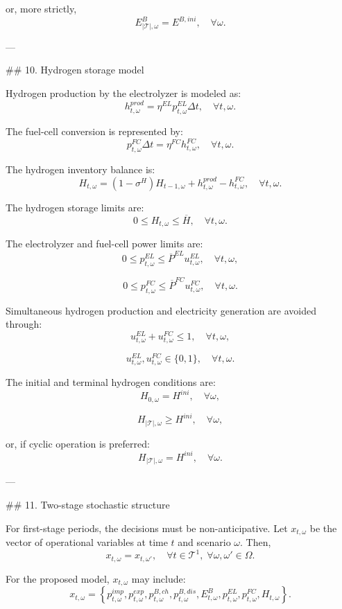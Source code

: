 or, more strictly,
$$ E^{B}_{|\mathcal{T}|,\omega}=E^{B,ini},
\quad \forall \omega. $$

---

## 10. Hydrogen storage model

Hydrogen production by the electrolyzer is modeled as:
$$ h^{prod}_{t,\omega}=\eta^{EL}p^{EL}_{t,\omega}\Delta t,
\quad \forall t,\omega. $$

The fuel-cell conversion is represented by:
$$ p^{FC}_{t,\omega}\Delta t=\eta^{FC}h^{FC}_{t,\omega},
\quad \forall t,\omega. $$

The hydrogen inventory balance is:
$$ H_{t,\omega}=(1-\sigma^{H})H_{t-1,\omega}
+h^{prod}_{t,\omega}-h^{FC}_{t,\omega},
\quad \forall t,\omega. $$

The hydrogen storage limits are:
$$ 0\le H_{t,\omega}\le \overline{H},
\quad \forall t,\omega. $$

The electrolyzer and fuel-cell power limits are:
$$ 0\le p^{EL}_{t,\omega}\le \overline{P}^{EL}u^{EL}_{t,\omega},
\quad \forall t,\omega, $$

$$ 0\le p^{FC}_{t,\omega}\le \overline{P}^{FC}u^{FC}_{t,\omega},
\quad \forall t,\omega. $$

Simultaneous hydrogen production and electricity generation are avoided through:
$$ u^{EL}_{t,\omega}+u^{FC}_{t,\omega}\le 1,
\quad \forall t,\omega, $$

$$ u^{EL}_{t,\omega},u^{FC}_{t,\omega}\in\{0,1\},
\quad \forall t,\omega. $$

The initial and terminal hydrogen conditions are:
$$ H_{0,\omega}=H^{ini},
\quad \forall \omega, $$

$$ H_{|\mathcal{T}|,\omega}\ge H^{ini},
\quad \forall \omega, $$

or, if cyclic operation is preferred:
$$ H_{|\mathcal{T}|,\omega}=H^{ini},
\quad \forall \omega. $$

---

## 11. Two-stage stochastic structure

For first-stage periods, the decisions must be non-anticipative. Let $x_{t,\omega}$ be the vector of operational variables at time $t$ and scenario $\omega$. Then,
$$ x_{t,\omega}=x_{t,\omega'},
\quad \forall t\in\mathcal{T}^{1},\; \forall \omega,\omega'\in\Omega. $$

For the proposed model, $x_{t,\omega}$ may include:
$$ x_{t,\omega}=\left\{
 p^{imp}_{t,\omega},p^{exp}_{t,\omega},p^{B,ch}_{t,\omega},p^{B,dis}_{t,\omega},E^{B}_{t,\omega},
 p^{EL}_{t,\omega},p^{FC}_{t,\omega},H_{t,\omega}
\right\}. $$

